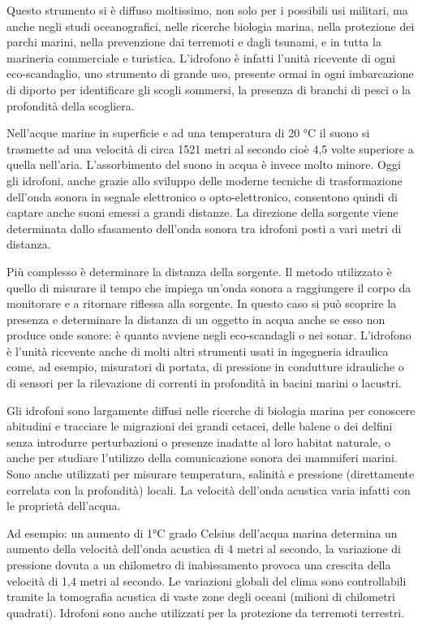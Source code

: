 Questo strumento si è diffuso moltissimo, non solo per i possibili usi militari, ma anche negli studi oceanografici, nelle ricerche biologia marina, nella protezione dei parchi marini, nella prevenzione dai terremoti e dagli tsunami, e in tutta la marineria commerciale e turistica. L’idrofono è infatti l’unità ricevente di ogni eco-scandaglio, uno strumento di grande uso, presente ormai in ogni imbarcazione di diporto per identificare gli scogli sommersi, la presenza di branchi di pesci o la profondità della scogliera.

Nell’acque marine in superficie e ad una temperatura di 20 °C il suono si trasmette ad una velocità di circa 1521 metri al secondo cioè 4,5 volte superiore a quella nell'aria. L’assorbimento del suono in acqua è invece molto minore. Oggi gli idrofoni, anche grazie allo sviluppo delle moderne tecniche di trasformazione dell’onda sonora in segnale elettronico o opto-elettronico, consentono quindi di captare anche suoni emessi a grandi distanze. La direzione della sorgente viene determinata dallo sfasamento dell’onda sonora tra idrofoni posti a vari metri di distanza.

Più complesso è determinare la distanza della sorgente. Il metodo utilizzato è quello di misurare il tempo che impiega un’onda sonora a raggiungere il corpo da monitorare e a ritornare riflessa alla sorgente. In questo caso si può scoprire la presenza e determinare la distanza di un oggetto in acqua anche se esso non produce onde sonore: è quanto avviene negli eco-scandagli o nei sonar. L’idrofono è l’unità ricevente anche di molti altri strumenti usati in ingegneria idraulica come, ad esempio, misuratori di portata, di pressione in condutture idrauliche o di sensori per la rilevazione di correnti in profondità in bacini marini o lacustri.

Gli idrofoni sono largamente diffusi nelle ricerche di biologia marina per conoscere abitudini e tracciare le migrazioni dei grandi cetacei, delle balene o dei delfini senza introdurre perturbazioni o presenze inadatte al loro habitat naturale, o anche per studiare l’utilizzo della comunicazione sonora dei mammiferi marini. Sono anche utilizzati per misurare temperatura, salinità e pressione (direttamente correlata 
con la profondità) locali. La velocità dell’onda acustica varia infatti con le proprietà dell’acqua. 

Ad esempio: un aumento di 1°C grado Celsius  dell’acqua marina determina un aumento della velocità dell’onda acustica di 4 metri al secondo, la variazione di pressione dovuta a un chilometro di inabissamento provoca una crescita della velocità di 1,4 metri al secondo. Le variazioni globali del clima sono controllabili tramite la tomografia acustica di vaste zone degli oceani (milioni di chilometri quadrati). Idrofoni sono anche utilizzati per la protezione da terremoti terrestri. 


